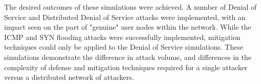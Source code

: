 The desired outcomes of these simulations were achieved. A number of Denial of
Service and Distributed Denial of Service attacks were implemented, with an
impact seen on the part of "genuine" user nodes within the network. While the
ICMP and SYN flooding attacks were successfully implemented, mitigation
techniques could only be applied to the Denial of Service simulations. These
simulations demonstrate the difference in attack volume, and differences in the
complexity of defense and mitigation techniques required for a single attacker
versus a distributed network of attackers.
